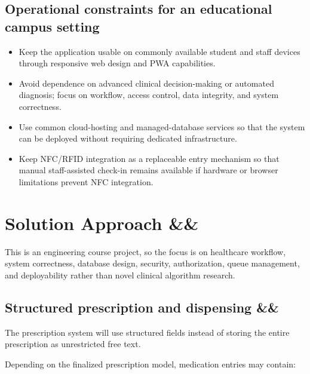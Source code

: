 \documentclass[11pt,a4paper]{article}
\newcommand{\BvrHint}[1]{%
  \ifx&#1&%
  \else
    {\normalfont\normalsize\itshape\hfill #1}%
  \fi}
\begin{document}
\subsection{Operational constraints for an educational campus setting}

\begin{itemize}

    \item Keep the application usable on commonly available student and staff devices through responsive web design and PWA capabilities.

    \item Avoid dependence on advanced clinical decision-making or automated diagnosis; focus on workflow, access control, data integrity, and system correctness.

    \item Use common cloud-hosting and managed-database services so that the system can be deployed without requiring dedicated infrastructure.

    \item Keep NFC/RFID integration as a replaceable entry mechanism so that manual staff-assisted check-in remains available if hardware or browser limitations prevent NFC integration.

\end{itemize}


\section{Solution Approach %
\BvrHint{}}

This is an engineering course project, so the focus is on healthcare workflow, system correctness, database design, security, authorization, queue management, and deployability rather than novel clinical algorithm research.

\subsection{Structured prescription and dispensing %
\BvrHint{}}

The prescription system will use structured fields instead of storing the entire prescription as unrestricted free text.

Depending on the finalized prescription model, medication entries may contain:
\end{document}
